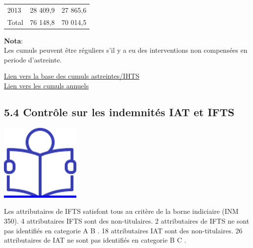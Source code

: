 \begin{longtable}[]{@{}lll@{}}
\begin{minipage}[t]{0.07\columnwidth}\raggedright
2013\strut
\end{minipage} & \begin{minipage}[t]{0.55\columnwidth}\raggedright
28 409,9\strut
\end{minipage} & \begin{minipage}[t]{0.29\columnwidth}\raggedright
27 865,6\strut
\end{minipage}\tabularnewline
\begin{minipage}[t]{0.07\columnwidth}\raggedright
Total\strut
\end{minipage} & \begin{minipage}[t]{0.55\columnwidth}\raggedright
76 148,8\strut
\end{minipage} & \begin{minipage}[t]{0.29\columnwidth}\raggedright
70 014,5\strut
\end{minipage}\tabularnewline
\bottomrule
\end{longtable}

\textbf{Nota}:\\
Les cumuls peuvent être réguliers s'il y a eu des interventions non
compensées en periode d'astreinte.

\href{../Bases/Reglementation/Controle_astreintes_HS_irreg.csv}{Lien vers
la base des cumuls astreintes/IHTS}\\
\href{../Bases/Reglementation/Cum_astreintes_HS_irreg.csv}{Lien vers les
cumuls annuels}

\hypertarget{controle-sur-les-indemnites-iat-et-ifts}{%
\subsection{5.4 Contrôle sur les indemnités IAT et
IFTS}\label{controle-sur-les-indemnites-iat-et-ifts}}

\href{../Docs/Notices/fiche_IAT_IFTS.odt}{\includegraphics{icones/Notice.png}}

Les attributaires de IFTS satisfont tous au critère de la borne
indiciaire (INM 350). 4 attributaires IFTS sont des non-titulaires. 2
attributaires de IFTS ne sont pas identifiés en categorie A B . 18
attributaires IAT sont des non-titulaires. 26 attributaires de IAT ne
sont pas identifiés en categorie B C .

